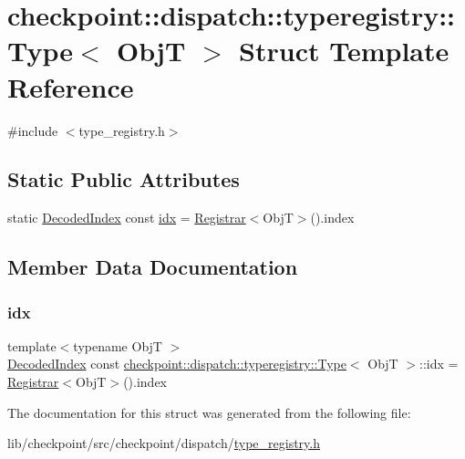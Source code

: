 \hypertarget{structcheckpoint_1_1dispatch_1_1typeregistry_1_1_type}{}\section{checkpoint\+:\+:dispatch\+:\+:typeregistry\+:\+:Type$<$ ObjT $>$ Struct Template Reference}
\label{structcheckpoint_1_1dispatch_1_1typeregistry_1_1_type}


{\ttfamily \#include $<$type\+\_\+registry.\+h$>$}

\subsection*{Static Public Attributes}
\begin{DoxyCompactItemize}
\item 
static \hyperlink{namespacecheckpoint_1_1dispatch_1_1typeregistry_a3d1f57de0a997a245eb9e1db07b94140}{Decoded\+Index} const \hyperlink{structcheckpoint_1_1dispatch_1_1typeregistry_1_1_type_ad6ffcb534a5000856120edd34ad04553}{idx} = \hyperlink{structcheckpoint_1_1dispatch_1_1typeregistry_1_1_registrar}{Registrar}$<$ObjT$>$().index
\end{DoxyCompactItemize}


\subsection{Member Data Documentation}
\mbox{\label{structcheckpoint_1_1dispatch_1_1typeregistry_1_1_type_ad6ffcb534a5000856120edd34ad04553}} 
\subsubsection{\texorpdfstring{idx}{idx}}
{\footnotesize\ttfamily template$<$typename ObjT $>$ \\
\hyperlink{namespacecheckpoint_1_1dispatch_1_1typeregistry_a3d1f57de0a997a245eb9e1db07b94140}{Decoded\+Index} const \hyperlink{structcheckpoint_1_1dispatch_1_1typeregistry_1_1_type}{checkpoint\+::dispatch\+::typeregistry\+::\+Type}$<$ ObjT $>$\+::idx = \hyperlink{structcheckpoint_1_1dispatch_1_1typeregistry_1_1_registrar}{Registrar}$<$ObjT$>$().index\hspace{0.3cm}{\ttfamily [static]}}



The documentation for this struct was generated from the following file\+:\begin{DoxyCompactItemize}
\item 
lib/checkpoint/src/checkpoint/dispatch/\hyperlink{type__registry_8h}{type\+\_\+registry.\+h}\end{DoxyCompactItemize}
